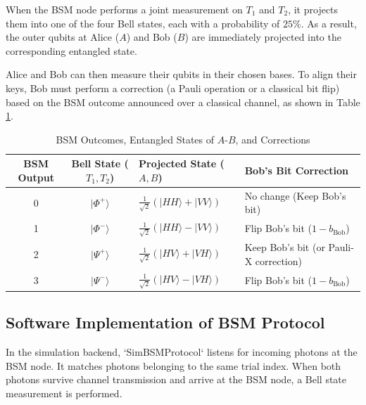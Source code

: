 \documentclass[12pt,oneside,letterpaper,english]{article}
\begin{document}
When the BSM node performs a joint measurement on $T_1$ and $T_2$, it projects them into one of the four Bell states, each with a probability of $25\%$. As a result, the outer qubits at Alice ($A$) and Bob ($B$) are immediately projected into the corresponding entangled state. 

Alice and Bob can then measure their qubits in their chosen bases. To align their keys, Bob must perform a correction (a Pauli operation or a classical bit flip) based on the BSM outcome announced over a classical channel, as shown in Table \ref{tab:bsm_corrections}.

\begin{table}[h!]
\centering
\caption{BSM Outcomes, Entangled States of $A$-$B$, and Corrections}
\label{tab:bsm_corrections}
\begin{tabular}{ccll}
\toprule
\textbf{BSM Output} & \textbf{Bell State ($T_1, T_2$)} & \textbf{Projected State ($A, B$)} & \textbf{Bob's Bit Correction} \\
\midrule
0 & $|\Phi^+\rangle$ & $\frac{1}{\sqrt{2}}(|HH\rangle + |VV\rangle)$ & No change (Keep Bob's bit) \\
1 & $|\Phi^-\rangle$ & $\frac{1}{\sqrt{2}}(|HH\rangle - |VV\rangle)$ & Flip Bob's bit ($1 - b_{\text{Bob}}$) \\
2 & $|\Psi^+\rangle$ & $\frac{1}{\sqrt{2}}(|HV\rangle + |VH\rangle)$ & Keep Bob's bit (or Pauli-X correction) \\
3 & $|\Psi^-\rangle$ & $\frac{1}{\sqrt{2}}(|HV\rangle - |VH\rangle)$ & Flip Bob's bit ($1 - b_{\text{Bob}}$) \\
\bottomrule
\end{tabular}
\end{table}

\subsection{Software Implementation of BSM Protocol}

In the simulation backend, `SimBSMProtocol` listens for incoming photons at the BSM node. It matches photons belonging to the same trial index. When both photons survive channel transmission and arrive at the BSM node, a Bell state measurement is performed.
\end{document}
